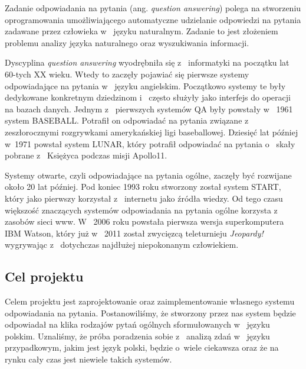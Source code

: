 

Zadanie odpowiadania na pytania (ang. \emph{question answering}) polega na stworzeniu oprogramowania umożliwiającego automatyczne udzielanie odpowiedzi na pytania zadawane przez człowieka w~ języku naturalnym. Zadanie to jest złożeniem problemu analizy języka naturalnego oraz wyszukiwania informacji.

Dyscyplina \emph{question answering} wyodrębniła się z~ informatyki na początku lat 60-tych XX wieku. Wtedy to zaczęły pojawiać się pierwsze systemy odpowiadające na pytania w~ języku angielskim. Początkowo systemy te były dedykowane konkretnym dziedzinom i~ często służyły jako interfejs do operacji na bazach danych. Jednym z~ pierwszych systemów QA były powstały  w~ 1961 system BASEBALL. Potrafił on odpowiadać na pytania związane z~ zeszłorocznymi rozgrywkami amerykańskiej ligi baseballowej. Dziesięć lat później w~1971 powstał system LUNAR, który potrafił odpowiadać na pytania o~ skały pobrane z~ Księżyca podczas misji Apollo11. 

Systemy otwarte, czyli odpowiadające na pytania ogólne, zaczęły być rozwijane około 20 lat później. Pod koniec 1993 roku stworzony został system START, który jako pierwszy korzystał z~ internetu jako źródła wiedzy. Od tego czasu większość znaczących systemów odpowiadania na pytania ogólne korzysta z~ zasobów sieci www. W~ 2006 roku powstała pierwsza wersja superkomputera IBM Watson, który już  w~ 2011 został zwycięzcą teleturnieju \emph{Jeopardy!} wygrywając z~ dotychczas najdłużej niepokonanym człowiekiem.

\subsection{Cel projektu}\label{subsec:wpr:cel}
Celem projektu jest zaprojektowanie oraz zaimplementowanie własnego systemu odpowiadania na pytania. Postanowiliśmy, że stworzony przez nas system będzie odpowiadał na klika rodzajów pytań ogólnych sformułowanych w~ języku polskim. Uznaliśmy, że próba poradzenia sobie z~ analizą zdań w~ języku przypadkowym, jakim jest język polski, będzie o~wiele ciekawsza oraz że na rynku cały czas jest niewiele takich systemów. 



